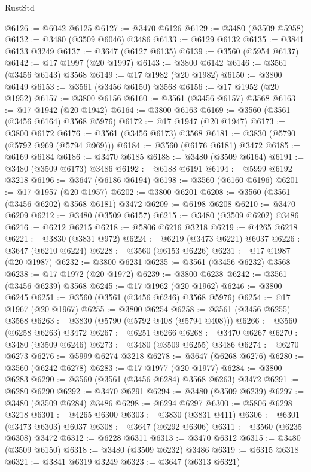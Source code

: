 \begin{lexlean}{RustStd}
\begin{coremodule}
@6126 := @6042 @6125
@6127 := @3470 @6126
@6129 := @3480 (@3509 @5958)
@6132 := @3480 (@3509 @6046) @3486
@6133 := @6129 @6132
@6135 := @3841 @6133 @3249
@6137 := @3647 (@6127 @6135)
@6139 := @3560 (@5954 @6137)
@6142 := @17 @1997 (@20 @1997)
@6143 := @3800 @6142
@6146 := @3561 (@3456 @6143) @3568
@6149 := @17 @1982 (@20 @1982)
@6150 := @3800 @6149
@6153 := @3561 (@3456 @6150) @3568
@6156 := @17 @1952 (@20 @1952)
@6157 := @3800 @6156
@6160 := @3561 (@3456 @6157) @3568
@6163 := @17 @1942 (@20 @1942)
@6164 := @3800 @6163
@6169 := @3560 (@3561 (@3456 @6164) @3568 @5976)
@6172 := @17 @1947 (@20 @1947)
@6173 := @3800 @6172
@6176 := @3561 (@3456 @6173) @3568
@6181 := @3830 (@5790 (@5792 @969 (@5794 @969)))
@6184 := @3560 (@6176 @6181) @3472
@6185 := @6169 @6184
@6186 := @3470 @6185
@6188 := @3480 (@3509 @6164)
@6191 := @3480 (@3509 @6173) @3486
@6192 := @6188 @6191
@6194 := @5999 @6192 @3218
@6196 := @3647 (@6186 @6194)
@6198 := @3560 (@6160 @6196)
@6201 := @17 @1957 (@20 @1957)
@6202 := @3800 @6201
@6208 := @3560 (@3561 (@3456 @6202) @3568 @6181) @3472
@6209 := @6198 @6208
@6210 := @3470 @6209
@6212 := @3480 (@3509 @6157)
@6215 := @3480 (@3509 @6202) @3486
@6216 := @6212 @6215
@6218 := @5806 @6216 @3218
@6219 := @4265 @6218
@6221 := @3830 (@3831 @972)
@6224 := @6219 (@3473 @6221) @6037
@6226 := @3647 (@6210 @6224)
@6228 := @3560 (@6153 @6226)
@6231 := @17 @1987 (@20 @1987)
@6232 := @3800 @6231
@6235 := @3561 (@3456 @6232) @3568
@6238 := @17 @1972 (@20 @1972)
@6239 := @3800 @6238
@6242 := @3561 (@3456 @6239) @3568
@6245 := @17 @1962 (@20 @1962)
@6246 := @3800 @6245
@6251 := @3560 (@3561 (@3456 @6246) @3568 @5976)
@6254 := @17 @1967 (@20 @1967)
@6255 := @3800 @6254
@6258 := @3561 (@3456 @6255) @3568
@6263 := @3830 (@5790 (@5792 @408 (@5794 @408)))
@6266 := @3560 (@6258 @6263) @3472
@6267 := @6251 @6266
@6268 := @3470 @6267
@6270 := @3480 (@3509 @6246)
@6273 := @3480 (@3509 @6255) @3486
@6274 := @6270 @6273
@6276 := @5999 @6274 @3218
@6278 := @3647 (@6268 @6276)
@6280 := @3560 (@6242 @6278)
@6283 := @17 @1977 (@20 @1977)
@6284 := @3800 @6283
@6290 := @3560 (@3561 (@3456 @6284) @3568 @6263) @3472
@6291 := @6280 @6290
@6292 := @3470 @6291
@6294 := @3480 (@3509 @6239)
@6297 := @3480 (@3509 @6284) @3486
@6298 := @6294 @6297
@6300 := @5806 @6298 @3218
@6301 := @4265 @6300
@6303 := @3830 (@3831 @411)
@6306 := @6301 (@3473 @6303) @6037
@6308 := @3647 (@6292 @6306)
@6311 := @3560 (@6235 @6308) @3472
@6312 := @6228 @6311
@6313 := @3470 @6312
@6315 := @3480 (@3509 @6150)
@6318 := @3480 (@3509 @6232) @3486
@6319 := @6315 @6318
@6321 := @3841 @6319 @3249
@6323 := @3647 (@6313 @6321)

\end{coremodule}
\end{lexlean}
